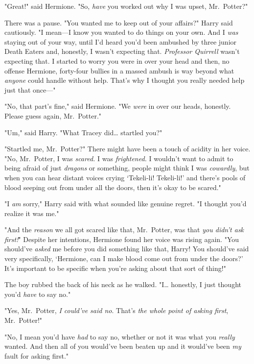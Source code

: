 "Great!" said Hermione. "So, \emph{have} you worked out why I was upset,
Mr.~Potter?"

There was a pause. "You wanted me to keep out of your affairs?" Harry said
cautiously. "I mean---I know you wanted to do things on your own. And I
\emph{was} staying out of your way, until I'd heard you'd been ambushed by
three junior Death Eaters and, honestly, I wasn't expecting that.
\emph{Professor Quirrell} wasn't expecting that. I started to worry you
were in over your head and then, no offense Hermione, forty-four bullies in a
massed ambush is way beyond what \emph{anyone} could handle without help.
That's why I thought you really needed help just that once---"

"No, that part's fine," said Hermione. "We \emph{were} in over our heads,
honestly. Please guess again, Mr.~Potter."

"Um," said Harry. "What Tracey did{\ldots} startled you?"

"Startled me, Mr.~Potter?" There might have been a touch of acidity in her
voice. "No, Mr.~Potter, I was \emph{scared.} I was \emph{frightened.} I
wouldn't want to admit to being afraid of just \emph{dragons} or something,
people might think I was \emph{cowardly}, but when you can hear distant voices
crying `Tekeli-li! Tekeli-li!' and there's pools of blood seeping out from
under all the doors, then it's okay to be scared."

"I \emph{am} sorry," Harry said with what sounded like genuine regret. "I
thought you'd realize it was me."

"And the \emph{reason} we all got scared like that, Mr.~Potter, was that
\emph{you didn't ask first!}" Despite her intentions, Hermione found her voice
was rising again. "You should've \emph{asked} me before you did something like
that, Harry! You should've said very specifically, `Hermione, can I make blood
come out from under the doors?' It's important to be specific when you're
asking about that sort of thing!"

The boy rubbed the back of his neck as he walked. "I{\ldots} honestly, I just
thought you'd \emph{have} to say no."

"Yes, Mr.~Potter, \emph{I could've said no}. That's \emph{the whole point of
asking first}, Mr.~Potter!"

"No, I mean you'd have \emph{had} to say no, whether or not it was what you
\emph{really} wanted. And then all of you would've been beaten up and it
would've been \emph{my} fault for asking first."


